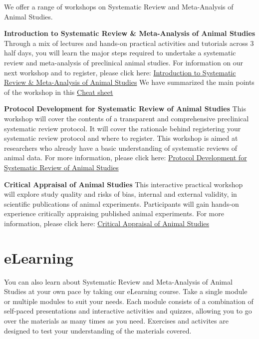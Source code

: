 \documentclass[
]{book}
\begin{document}
We offer a range of workshops on Systematic Review and Meta-Analysis of Animal Studies.

\textbf{Introduction to Systematic Review \& Meta-Analysis of Animal Studies}
Through a mix of lectures and hands-on practical activities and tutorials across 3 half days, you will learn the major steps required to undertake a systematic review and meta-analysis of preclinical animal studies. For information on our next workshop and to register, please click here: \href{https://www.bihealth.org/en/translation/innovation-enabler/quest-center/events/course/introduction-to-systematic-review-meta-analysis-of-animal-studies}{Introduction to Systematic Review \& Meta-Analysis of Animal Studies}
We have summarized the main points of the workshop in this \href{CheatSheet_IntroSRworkshop_2023.pdf}{Cheat sheet}

\textbf{Protocol Development for Systematic Review of Animal Studies}
This workshop will cover the contents of a transparent and comprehensive preclinical systematic review protocol. It will cover the rationale behind registering your systematic review protocol and where to register. This workshop is aimed at researchers who already have a basic understanding of systematic reviews of animal data. For more information, please click here: \href{https://www.bihealth.org/en/translation/innovation-enabler/quest-center/events/course/protocol-development-for-systematic-review-of-animal-studies}{Protocol Development for Systematic Review of Animal Studies}

\textbf{Critical Appraisal of Animal Studies}
This interactive practical workshop will explore study quality and risks of bias, internal and external validity, in scientific publications of animal experiments. Participants will gain hands-on experience critically appraising published animal experiments. For more information, please click here: \href{https://www.bihealth.org/en/translation/innovation-enabler/quest-center/events/course/critical-appraisal-of-animal-studies-practical-workshop}{Critical Appraisal of Animal Studies}

\section{eLearning}\label{elearning}

You can also learn about Systematic Review and Meta-Analysis of Animal Studies at your own pace by taking our eLearning course. Take a single module or multiple modules to suit your needs. Each module consists of a combination of self-paced presentations and interactive activities and quizzes, allowing you to go over the materials as many times as you need. Exercises and activites are designed to test your understanding of the materials covered.
\end{document}
